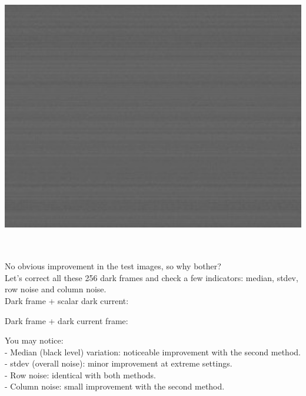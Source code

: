 \begin{center}
\includegraphics[height=12cm]{images/blackframes-gainx1-offset2047-64ms-01-darkcurrent-no-blackcol}
\end{center}

No obvious improvement in the test images, so why bother?\\

Let's correct all these 256 dark frames and check a few indicators: median, stdev, row noise and column noise.\\ 

Dark frame + scalar dark current: 
\begin{center}
\end{center}


Dark frame + dark current frame:
\begin{center}
\end{center}

You may notice:\\

- Median (black level) variation: noticeable improvement with the second method.\\
- stdev (overall noise): minor improvement at extreme settings.\\
- Row noise: identical with both methods.\\
- Column noise: small improvement with the second method.\\

